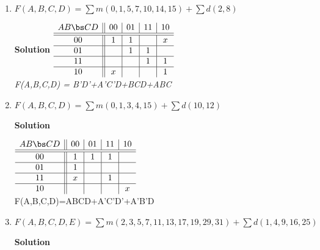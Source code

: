 \begin{enumerate}
\begin{enumerate}
\item $F(A,B,C,D)=\sum m(0,1,5,7,10,14,15)+\sum d(2,8)$

\begin{onlysolution}  \textbf{Solution} \itshape{
$\begin{array} {c||c|c|c|c}
   A B \bs C D   & 00 & 01 & 11 & 10 \\ \hline \hline
       00        & 1  & 1  &    & x  \\ \hline
       01        &    & 1  & 1  &    \\ \hline
       11        &    &    & 1  & 1  \\ \hline
       10        & x  &    &    & 1  \\
\end{array}$ \\
F(A,B,C,D) = B'D'+A'C'D+BCD+ABC
} \end{onlysolution} 
\item $F(A,B,C,D)=\sum m(0,1,3,4,15)+\sum d(10,12)$

\begin{onlysolution}  \textbf{Solution} \itshape{

$\begin{array} {c||c|c|c|c}
   A B \bs C D   & 00 & 01 & 11 & 10 \\ \hline \hline
       00        & 1  & 1  & 1  &    \\ \hline
       01        & 1  &    &    &    \\ \hline
       11        & x  &    & 1  &    \\ \hline
       10        &    &    &    & x  \\
\end{array}$ \\
F(A,B,C,D)=ABCD+A'C'D'+A'B'D
} \end{onlysolution} 
\item $F(A,B,C,D,E)=\sum m(2,3,5,7,11,13,17,19,29,31)+\sum d(1,4,9,16,25)$

\begin{onlysolution}  \textbf{Solution} \itshape{

}
\end{onlysolution}
\end{enumerate}
\end{enumerate}
